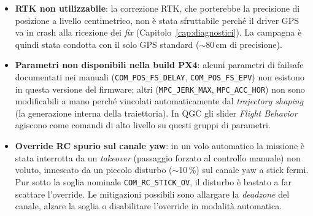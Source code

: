 \begin{itemize}
  \item \textbf{RTK non utilizzabile}: la correzione RTK, che porterebbe la
        precisione di posizione a livello centimetrico, non \`e stata sfruttabile
        perch\'e il driver GPS va in crash alla ricezione dei \emph{fix}
        (Capitolo~\ref{cap:diagnostici}). La campagna \`e quindi stata condotta
        con il solo GPS standard ($\sim$80\,cm di precisione).
  \item \textbf{Parametri non disponibili nella build PX4}: alcuni parametri di
        failsafe documentati nei manuali (\texttt{COM\_POS\_FS\_DELAY},
        \texttt{COM\_POS\_FS\_EPV}) non esistono in questa versione del firmware;
        altri (\texttt{MPC\_JERK\_MAX}, \texttt{MPC\_ACC\_HOR}) non sono
        modificabili a mano perch\'e vincolati automaticamente dal \emph{trajectory
        shaping} (la generazione interna della traiettoria). In QGC gli slider
        \emph{Flight Behavior} agiscono come comandi di alto livello su questi
        gruppi di parametri.
  \item \textbf{Override RC spurio sul canale yaw}: in un volo automatico la
        missione \`e stata interrotta da un \emph{takeover} (passaggio forzato al
        controllo manuale) non voluto, innescato da un piccolo disturbo
        ($\sim$10\,\%) sul canale yaw a stick fermi. Pur sotto la soglia nominale
        \texttt{COM\_RC\_STICK\_OV}, il disturbo \`e bastato a far scattare
        l'override. Le mitigazioni possibili sono allargare la \emph{deadzone} del
        canale, alzare la soglia o disabilitare l'override in modalit\`a
        automatica.
\end{itemize}

